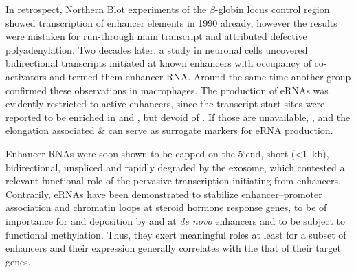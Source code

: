 In retrospect, Northern Blot experiments of the \ensuremath{\beta}-globin locus control region showed transcription of enhancer elements in 1990 already, however the results were mistaken for run-through main transcript and attributed defective polyadenylation\cite{Collis1990}. Two decades later, a study in neuronal cells uncovered bidirectional transcripts initiated at known enhancers with occupancy of co-activators and termed them enhancer RNA\cite{Kim2010}. Around the same time another group confirmed these observations in macrophages\cite{DeSanta2010}. The production of eRNAs was evidently restricted to active enhancers, since the transcript start sites were reported to be enriched in \hisfourone and \histwentysevenac, but devoid of \histwentyseventhree. If those are unavailable, \hiseightac, \hisnineac and the elongation associated \histhirtysixthree \& \hisseventyninetwo can serve as surrogate markers for eRNA production\cite{Zhu2013a}.

Enhancer RNAs were soon shown to be capped on the 5\lq end, short (\textless\SI{1}{kb}), bidirectional, unspliced and rapidly degraded by the exosome\cite{Koch2011,Andersson2014,Core2014}, which contested a relevant functional role of the pervasive transcription initiating from enhancers. Contrarily, eRNAs have been demonstrated to stabilize enhancer–promoter association and chromatin loops at steroid hormone response genes\cite{Wang2011,Li2013a}, to be of importance for \hisfourone and \hisfourtwo deposition by  and  at \emph{de novo} enhancers\cite{Kaikkonen2013} and to be subject to functional methylation\cite{Aguilo2016}. Thus, they exert meaningful roles at least for a subset of enhancers  and their expression generally correlates with the that of their target genes\cite{Arner2015}.

